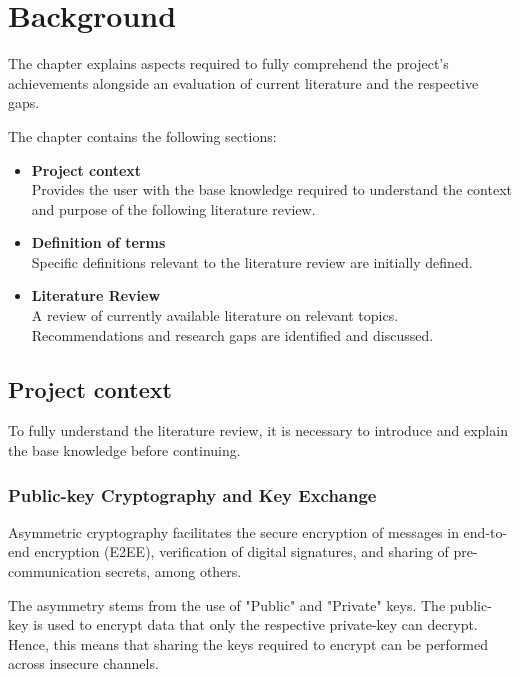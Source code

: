 \chapter{Background}
\label{cha:LiteratureReview}

The chapter explains aspects required to fully comprehend the project's achievements alongside an evaluation of current literature and the respective gaps.

The chapter contains the following sections:

\begin{itemize}
    \item \textbf{Project context} \\ 
    Provides the user with the base knowledge required to understand the context and purpose of the following literature review.
    
    \item \textbf{Definition of terms}\\
    Specific definitions relevant to the literature review are initially defined.
    
    \item \textbf{Literature Review} \\
    A review of currently available literature on relevant topics. Recommendations and research gaps are identified and discussed.

\end{itemize}

\section{Project context}

To fully understand the literature review, it is necessary to introduce and explain the base knowledge before continuing.

\subsection{Public-key Cryptography and Key Exchange}

Asymmetric cryptography facilitates the secure encryption of messages in end-to-end encryption (E2EE), verification of digital signatures, and sharing of pre-communication secrets, among others. 

The asymmetry stems from the use of "Public" and "Private" keys. The public-key is used to encrypt data that only the respective private-key can decrypt. Hence, this means that sharing the keys required to encrypt can be performed across insecure channels.


